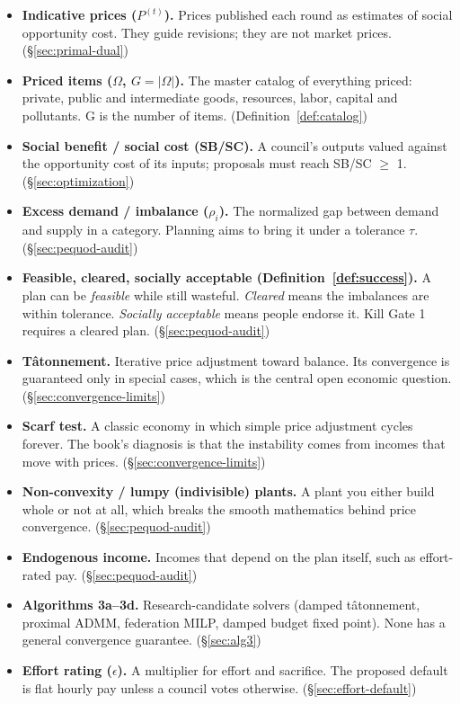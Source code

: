 \documentclass[10pt,twoside,openany]{book}
\theoremstyle{dpepstyle}
\begin{document}
\begin{itemize}[leftmargin=1.2em,itemsep=2pt,topsep=2pt]
\item \textbf{Indicative prices ($P^{(t)}$).} Prices published each round as estimates of social opportunity cost. They guide revisions; they are not market prices. (\S\ref{sec:primal-dual})
\item \textbf{Priced items ($\Omega$, $G = |\Omega|$).} The master catalog of everything priced: private, public and intermediate goods, resources, labor, capital and pollutants. G is the number of items. (Definition~\ref{def:catalog})
\item \textbf{Social benefit / social cost (SB/SC).} A council's outputs valued against the opportunity cost of its inputs; proposals must reach SB/SC $\geq$ 1. (\S\ref{sec:optimization})
\item \textbf{Excess demand / imbalance ($\rho_i$).} The normalized gap between demand and supply in a category. Planning aims to bring it under a tolerance $\tau$. (\S\ref{sec:pequod-audit})
\item \textbf{Feasible, cleared, socially acceptable (Definition~\ref{def:success}).} A plan can be \emph{feasible} while still wasteful. \emph{Cleared} means the imbalances are within tolerance. \emph{Socially acceptable} means people endorse it. Kill Gate 1 requires a cleared plan. (\S\ref{sec:pequod-audit})
\item \textbf{Tâtonnement.} Iterative price adjustment toward balance. Its convergence is guaranteed only in special cases, which is the central open economic question. (\S\ref{sec:convergence-limits})
\item \textbf{Scarf test.} A classic economy in which simple price adjustment cycles forever. The book's diagnosis is that the instability comes from incomes that move with prices. (\S\ref{sec:convergence-limits})
\item \textbf{Non-convexity / lumpy (indivisible) plants.} A plant you either build whole or not at all, which breaks the smooth mathematics behind price convergence. (\S\ref{sec:pequod-audit})
\item \textbf{Endogenous income.} Incomes that depend on the plan itself, such as effort-rated pay. (\S\ref{sec:pequod-audit})
\item \textbf{Algorithms 3a--3d.} Research-candidate solvers (damped tâtonnement, proximal ADMM, federation MILP, damped budget fixed point). None has a general convergence guarantee. (\S\ref{sec:alg3})
\item \textbf{Effort rating ($\epsilon$).} A multiplier for effort and sacrifice. The proposed default is flat hourly pay unless a council votes otherwise. (\S\ref{sec:effort-default})

\end{itemize}
\end{document}

